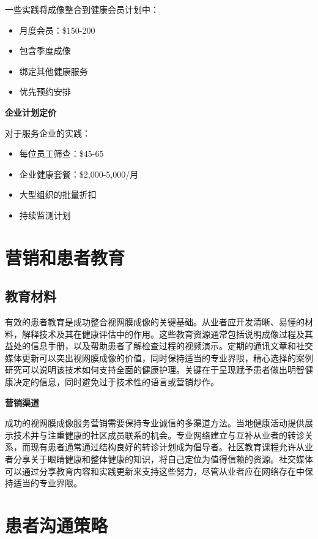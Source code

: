 \documentclass[
  Letterpaper,
]{scrbook}
\providecommand{\tightlist}{%
  \setlength{\itemsep}{0pt}\setlength{\parskip}{0pt}}\usepackage{longtable,booktabs,array}
\begin{document}
一些实践将成像整合到健康会员计划中：

\begin{itemize}
\tightlist
\item
  月度会员：\$150-200
\item
  包含季度成像
\item
  绑定其他健康服务
\item
  优先预约安排
\end{itemize}

\textbf{企业计划定价}

对于服务企业的实践：

\begin{itemize}
\tightlist
\item
  每位员工筛查：\$45-65
\item
  企业健康套餐：\$2,000-5,000/月
\item
  大型组织的批量折扣
\item
  持续监测计划
\end{itemize}

\section{营销和患者教育}\label{ux8425ux9500ux548cux60a3ux8005ux6559ux80b2}

\subsection*{教育材料}\label{ux6559ux80b2ux6750ux6599}

有效的患者教育是成功整合视网膜成像的关键基础。从业者应开发清晰、易懂的材料，解释技术及其在健康评估中的作用。这些教育资源通常包括说明成像过程及其益处的信息手册，以及帮助患者了解检查过程的视频演示。定期的通讯文章和社交媒体更新可以突出视网膜成像的价值，同时保持适当的专业界限，精心选择的案例研究可以说明该技术如何支持全面的健康护理。关键在于呈现赋予患者做出明智健康决定的信息，同时避免过于技术性的语言或营销炒作。

\textbf{营销渠道}

成功的视网膜成像服务营销需要保持专业诚信的多渠道方法。当地健康活动提供展示技术并与注重健康的社区成员联系的机会。专业网络建立与互补从业者的转诊关系，而现有患者通常通过结构良好的转诊计划成为倡导者。社区教育课程允许从业者分享关于眼睛健康和整体健康的知识，将自己定位为值得信赖的资源。社交媒体可以通过分享教育内容和实践更新来支持这些努力，尽管从业者应在网络存在中保持适当的专业界限。

\section{患者沟通策略}\label{ux60a3ux8005ux6c9fux901aux7b56ux7565}
\end{document}
